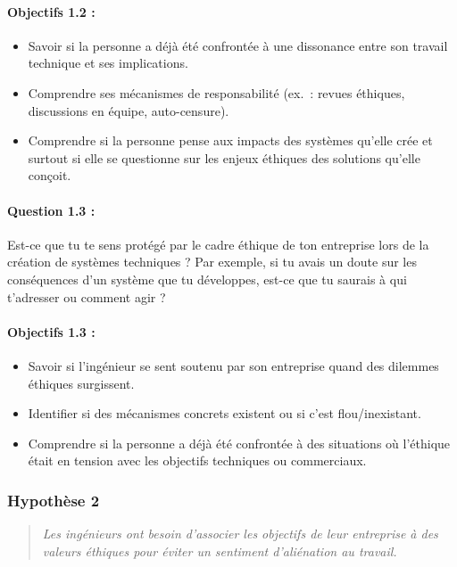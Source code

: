 \documentclass[12pt,a4paper]{report}
\begin{document}
\paragraph{Objectifs 1.2 :}
\begin{itemize}
    \item Savoir si la personne a déjà été confrontée à une dissonance entre son travail technique et ses implications.
    \item Comprendre ses mécanismes de responsabilité (ex.~: revues éthiques, discussions en équipe, auto-censure).
    \item Comprendre si la personne pense aux impacts des systèmes qu'elle crée et surtout si elle se questionne sur les enjeux éthiques des solutions qu'elle conçoit.
\end{itemize}

\paragraph{Question 1.3 :}
Est-ce que tu te sens protégé par le cadre éthique de ton entreprise lors de la création de systèmes techniques ? Par exemple, si tu avais un doute sur les conséquences d'un système que tu développes, est-ce que tu saurais à qui t'adresser ou comment agir ?

\paragraph{Objectifs 1.3 :}
\begin{itemize}
    \item Savoir si l'ingénieur se sent soutenu par son entreprise quand des dilemmes éthiques surgissent.
    \item Identifier si des mécanismes concrets existent ou si c'est flou/inexistant.
    \item Comprendre si la personne a déjà été confrontée à des situations où l'éthique était en tension avec les objectifs techniques ou commerciaux.
\end{itemize}

\subsubsection*{Hypothèse 2}

\begin{quote}
\textit{Les ingénieurs ont besoin d'associer les objectifs de leur entreprise à des valeurs éthiques pour éviter un sentiment d'aliénation au travail.}
\end{quote}
\end{document}
